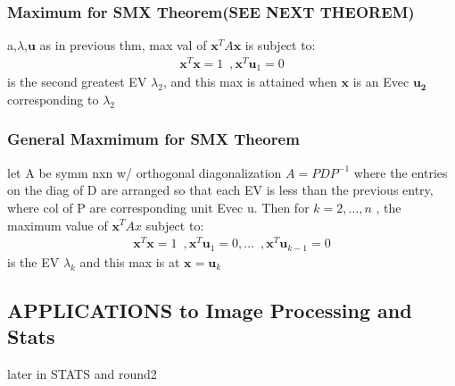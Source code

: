 \documentclass[12pt]{article}
\begin{document}
    \subsubsection{Maximum for SMX Theorem(SEE NEXT THEOREM)}
        a,$\lambda $,$\bm{u}$  as in previous thm,
        max val of $\bm{x}^TA\bm{x}$  is subject to:
        \begin{align*}
            \bm{x}^T\bm{x}= 1\,\,\,,\bm{x}^T\bm{u}_{1}= 0
        \end{align*}
        is the second greatest EV $\lambda _{2}$, and this max is attained
        when $\bm{x}$  is an Evec $\bm{u_{2}}$  corresponding to $\lambda _{2}$ 
    \subsubsection{General Maxmimum for SMX Theorem}
        let A be symm nxn w/ orthogonal diagonalization $A= PDP^{-1}$ 
        where the entries on the diag of D are arranged so that
        each EV is less than the previous entry, where col of P are
        corresponding unit Evec u. Then for $k= 2,\dots ,n$ , the
        maximum value of $\bm{x}^TAx$  subject to:
        \begin{align*}
             \bm{x}^T\bm{x}= 1\,\,\,,\bm{x}^T\bm{u}_{1}= 0,\dots 
             \,\,\,,\bm{x}^T\bm{u}_{k-1}= 0
        \end{align*}
        is the EV $\lambda _{k}$  and this max is at
        $\bm{x}= \bm{u}_{k}$ 




\subsection{APPLICATIONS to Image Processing and Stats}
    later in STATS and round2   
\end{document}
